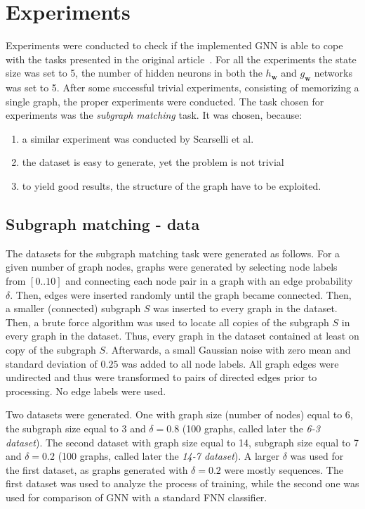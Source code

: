 
\chapter{Experiments~\label{ch:experiments}}
Experiments were conducted to check if the implemented GNN is able to cope with the tasks presented in the original article~\cite{scarselli2009graph}. For all the experiments the state size was set to 5, the number of hidden neurons in both the $h_{\bm{w}}$ and $g_{\bm{w}}$ networks was set to 5. After some successful trivial experiments, consisting of memorizing a single graph, the proper experiments were conducted. The task chosen for experiments was the \emph{subgraph matching} task. It was chosen, because:
\begin{enumerate}
	\item a similar experiment was conducted by Scarselli et al.~\cite{scarselli2009graph}
	\item the dataset is easy to generate, yet the problem is not trivial
	\item to yield good results, the structure of the graph have to be exploited.
\end{enumerate}

\section{Subgraph matching - data}
The datasets for the subgraph matching task were generated as follows. For a given number of graph nodes, graphs were generated by selecting node labels from $[0..10]$ and connecting each node pair in a graph with an edge probability $\delta$. Then, edges were inserted randomly until the graph became connected. Then, a smaller (connected) subgraph $S$ was inserted to every graph in the dataset. Then, a brute force algorithm was used to locate all copies of the subgraph $S$ in every graph in the dataset. Thus, every graph in the dataset contained at least on copy of the subgraph $S$. Afterwards, a small Gaussian noise with zero mean and standard deviation of $0.25$ was added to all node labels. All graph edges were undirected and thus were transformed to pairs of directed edges prior to processing. No edge labels were used.

Two datasets were generated. One with graph size (number of nodes) equal to 6, the subgraph size equal to 3 and $\delta = 0.8$ (100 graphs, called later the \emph{6-3 dataset}). The second dataset with graph size equal to 14, subgraph size equal to 7 and $\delta = 0.2$ (100 graphs, called later the \emph{14-7 dataset}). A larger $\delta$ was used for the first dataset, as graphs generated with $\delta = 0.2$ were mostly sequences. The first dataset was used to analyze the process of training, while the second one was used for comparison of GNN with a standard FNN classifier.

